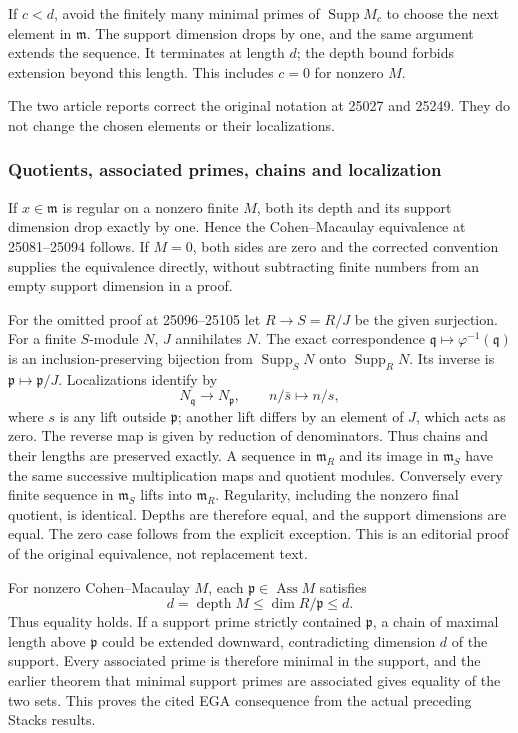 If \(c<d\), avoid the finitely many minimal primes of \(\operatorname{Supp}M_c\) to choose the next element in \(\mathfrak m\). The support dimension drops by one, and the same argument extends the sequence. It terminates at length \(d\); the depth bound forbids extension beyond this length. This includes \(c=0\) for nonzero \(M\).

The two article reports correct the original notation at 25027 and 25249. They do not change the chosen elements or their localizations.

\subsubsection{Quotients, associated primes, chains and localization}\label{algebra-proof-019-quotients-associated-primes-chains-and-localization}

If \(x\in\mathfrak m\) is regular on a nonzero finite \(M\), both its depth and its support dimension drop exactly by one. Hence the Cohen--Macaulay equivalence at 25081--25094 follows. If \(M=0\), both sides are zero and the corrected convention supplies the equivalence directly, without subtracting finite numbers from an empty support dimension in a proof.

For the omitted proof at 25096--25105 let \(R\to S=R/J\) be the given surjection. For a finite \(S\)-module \(N\), \(J\) annihilates \(N\). The exact correspondence \(\mathfrak q\mapsto\varphi^{-1}(\mathfrak q)\) is an inclusion-preserving bijection from \(\operatorname{Supp}_S N\) onto \(\operatorname{Supp}_R N\). Its inverse is \(\mathfrak p\mapsto\mathfrak p/J\). Localizations identify by \[
 N_{\mathfrak q}\longrightarrow N_{\mathfrak p},\qquad n/\bar s\longmapsto n/s,
\] where \(s\) is any lift outside \(\mathfrak p\); another lift differs by an element of \(J\), which acts as zero. The reverse map is given by reduction of denominators. Thus chains and their lengths are preserved exactly. A sequence in \(\mathfrak m_R\) and its image in \(\mathfrak m_S\) have the same successive multiplication maps and quotient modules. Conversely every finite sequence in \(\mathfrak m_S\) lifts into \(\mathfrak m_R\). Regularity, including the nonzero final quotient, is identical. Depths are therefore equal, and the support dimensions are equal. The zero case follows from the explicit exception. This is an editorial proof of the original equivalence, not replacement text.

For nonzero Cohen--Macaulay \(M\), each \(\mathfrak p\in\operatorname{Ass}M\) satisfies \[
 d=\operatorname{depth}M\le\dim R/\mathfrak p\le d.
\] Thus equality holds. If a support prime strictly contained \(\mathfrak p\), a chain of maximal length above \(\mathfrak p\) could be extended downward, contradicting dimension \(d\) of the support. Every associated prime is therefore minimal in the support, and the earlier theorem that minimal support primes are associated gives equality of the two sets. This proves the cited EGA consequence from the actual preceding Stacks results.

